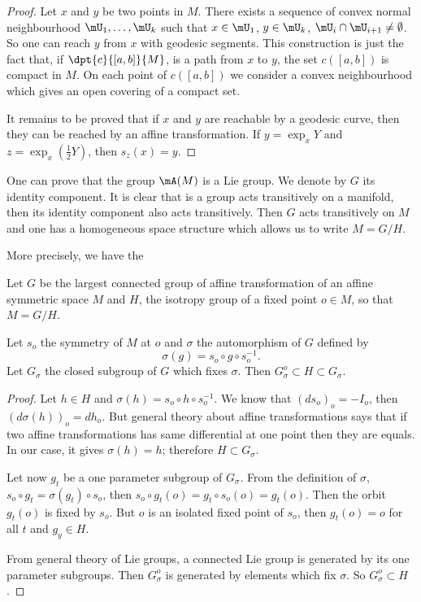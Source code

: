 \begin{proof}
Let $x$ and $y$ be two points in $M$. There exists a sequence of convex normal neighbourhood $\mU_1,\ldots,\mU_k$ such that $x\in\mU_1$, $y\in\mU_k$, $\mU_i\cap\mU_{i+1}\neq\emptyset$. So one can reach $y$ from $x$ with geodesic segments. This construction is just the fact that, if $\dpt{c}{[a,b]}{M}$, is a path from $x$ to $y$, the set $c([a,b])$ is compact in $M$. On each point of $c([a,b])$ we consider a convex neighbourhood which gives an open covering of a compact set.

It remains to be proved that if $x$ and $y$ are reachable by a geodesic curve, then they can be reached by an affine transformation. If $y=\exp_x Y$ and $z=\exp_x(\frac{1}{2} Y)$, then  $s_z(x)=y$.

\end{proof}

One can prove that the group $\mA(M)$ is a Lie group. We denote by $G$ its identity component. It is clear that is a group acts transitively on a manifold, then its identity component also acts transitively. Then $G$ acts transitively on $M$ and one has a homogeneous space structure which allows us to write $M=G/H$.

More precisely, we have the

\begin{theorem}		\label{ThoGplugdSymssgpAff}
Let $G$ be the largest connected group of affine transformation of an affine symmetric space $M$ and $H$, the isotropy group of a fixed point $o\in M$, so that $M=G/H$.

Let $s_o$ the symmetry of $M$ at $o$ and $\sigma$ the automorphism of $G$ defined by
\[
   \sigma(g)=s_o\circ g\circ s_o^{-1}.
\]
Let $G_{\sigma}$ the closed subgroup of $G$ which fixes $\sigma$. Then $G^o_{\sigma}\subset H\subset G_{\sigma}$.
\end{theorem}

\begin{proof}
Let $h\in H$ and $\sigma(h)=s_o\circ h\circ s_o^{-1}$. We know that $(ds_o)_o=-I_o$, then $(d\sigma(h))_o=dh_o$. But general theory about affine transformations says that if two affine transformations has same differential at one point then they are equals. In our case, it gives $\sigma(h)=h$; therefore $H\subset G_{\sigma}$.

Let now $g_t$ be a one parameter subgroup of $G_{\sigma}$. From the definition of $\sigma$, $s_o\circ g_t=\sigma(g_t)\circ s_o$, then $s_o\circ g_t(o)=g_t\circ s_o(o)=g_t(o)$. Then the orbit $g_t(o)$ is fixed by $s_o$. But $o$ is an isolated fixed point of $s_o$, then $g_t(o)=o$ for all $t$ and $g_y\in H$.

From general theory of Lie groups, a connected Lie group is generated by its one parameter subgroups. Then $G_{\sigma}^o$ is generated by elements which fix $\sigma$. So $G_{\sigma}^o\subset H$.
\end{proof}

